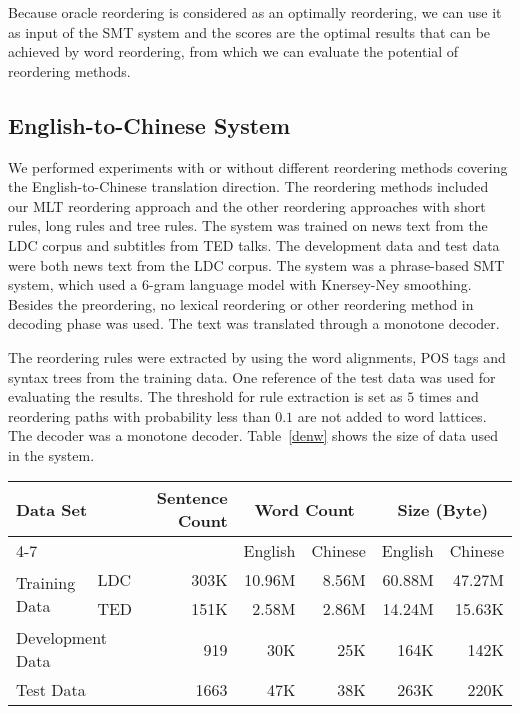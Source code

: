 \documentclass[a4paper]{article}
\begin{document}
Because oracle reordering is considered as an optimally reordering, we can use it as input of the SMT system and the scores are the optimal results that can be achieved by word reordering, from which we can evaluate the potential of reordering methods.


\subsection{English-to-Chinese System}

We performed experiments with or without different reordering methods covering the English-to-Chinese translation direction. The reordering methods included our MLT reordering approach and the other reordering approaches with short rules, long rules and tree rules. The system was trained on news text from the LDC corpus and subtitles from TED talks. The development data and test data were both news text from the LDC corpus. The system was a phrase-based SMT system, which used a $6$-gram language model with Knersey-Ney smoothing. Besides the preordering, no lexical reordering or other reordering method in decoding phase was used. The text was translated through a monotone decoder.

The reordering rules were extracted by using the word alignments, POS tags and syntax trees from the training data. One reference of the test data was used for evaluating the results. The threshold for rule extraction is set as $5$ times and reordering paths with probability less than $0.1$ are not added to word lattices. The decoder was a monotone decoder. Table~\ref{denw} shows the size of data used in the system.

\begin{table*}
\centering
\begin{tabular}{|ll|r|r|r|r|r|}
\hline
\multicolumn{2}{|l|}{\multirow{2}{*}{Data Set}} & \multirow{2}{*}{Sentence Count} & \multicolumn{2}{c|}{Word Count} & \multicolumn{2}{c|}{Size (Byte)}\\ \cline{4-7}
& & & English & Chinese & English & Chinese \\
\hline
\multirow{2}{*}{Training Data} & \multicolumn{1}{|l|}{LDC} & 303K & 10.96M & 8.56M & 60.88M & 47.27M \\ \cline{2-7}
& \multicolumn{1}{|l|}{TED} & 151K & 2.58M & 2.86M & 14.24M & 15.63K \\ \hline
\multicolumn{2}{|l|}{Development Data} & 919 & 30K & 25K & 164K & 142K \\ \hline
\multicolumn{2}{|l|}{Test Data} & 1663 & 47K & 38K & 263K & 220K \\ \hline
\end{tabular}
\caption{Data details in English-to-Chinese system}
\label{denw}
\end{table*}
\end{document}
